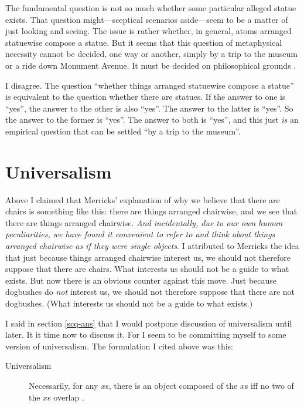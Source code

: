 \documentclass[11pt]{article}
\newenvironment{squote}{%
\begin{spacing}{1}
       	\begin{list}{}{%
\setlength{\labelwidth}{0pt}%
\rightmargin\leftmargin%
}
\item\relax
}{%
\end{list}%
\end{spacing}
}
\begin{document}
\begin{spacing}{1.25}
\begin{squote}
The fundamental question is not so much whether some particular
alleged statue exists.  That question might---sceptical scenarios
aside---seem to be a matter of just looking and seeing.  The issue is
rather whether, in general, atoms arranged statuewise compose a
statue.  But it seems that this question of metaphysical necessity
cannot be decided, one way or another, simply by a trip to the museum
or a ride down Monument Avenue.  It must be decided on philosophical
grounds \citeyearpar[9]{merricks2001a}.
\end{squote}

I disagree.  The question ``whether things arranged statuewise compose
a statue'' is equivalent to the question whether there are statues.
If the answer to one is ``yes'', the answer to the other is also
``yes''.  The answer to the latter is ``yes''.  So the answer to the
former is ``yes''.  The answer to both is ``yes'', and this just {\em
  is} an empirical question that can be settled ``by a trip to the
museum''.

\section{Universalism}
\label{universalism}
Above I claimed that Merricks' explanation of why we believe that
there are chairs is something like this: there are things arranged
chairwise, and we see that there are things arranged chairwise.  {\em
  And incidentally, due to our own human peculiarities, we have found
  it convenient to refer to and think about things arranged chairwise
  as if they were single objects}.  I attributed to Merricks the idea
that just because things arranged chairwise interest us, we should not
therefore suppose that there are chairs.  What interests us should not
be a guide to what exists.  But now there is an obvious counter
against this move.  Just because dogbushes do {\em not} interest us,
we should not therefore suppose that there are not dogbushes.  (What
interests us should not be a guide to what exists.)

I said in section \ref{scq-ans} that I would postpone discussion of
universalism until later.  It it time now to discuss it.  For I seem
to be committing myself to some version of universalism.  The
formulation I cited above was this:

\begin{description}
\item[Universalism] Necessarily, for any $x$s, there is an object
  composed of the $x$s iff no two of the $x$s overlap
  \citep[227]{markosian1998a}.
\end{description}


\end{spacing}
\end{document}
